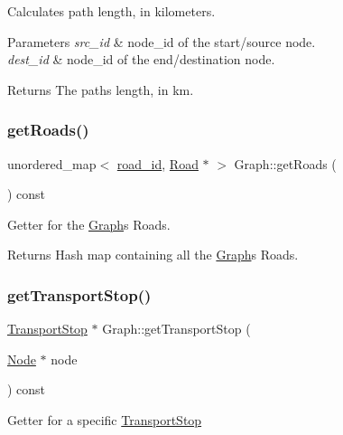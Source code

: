 Calculates path length, in kilometers.


\begin{DoxyParams}{Parameters}
{\em src\+\_\+id} & node\+\_\+id of the start/source node. \\
\hline
{\em dest\+\_\+id} & node\+\_\+id of the end/destination node.\\
\hline
\end{DoxyParams}
\begin{DoxyReturn}{Returns}
The path\textquotesingle{}s length, in km. 
\end{DoxyReturn}
\hypertarget{class_graph_a101befc9baedb7dc3aaa714c968dc943}{}\label{class_graph_a101befc9baedb7dc3aaa714c968dc943} 
\subsubsection{\texorpdfstring{get\+Roads()}{getRoads()}}
{\footnotesize\ttfamily unordered\+\_\+map$<$ \hyperlink{_road_8hpp_a8e0db0d135782948da5d293720dbfb46}{road\+\_\+id}, \hyperlink{class_road}{Road} $\ast$ $>$ Graph\+::get\+Roads (\begin{DoxyParamCaption}{ }\end{DoxyParamCaption}) const}

Getter for the \hyperlink{class_graph}{Graph}\textquotesingle{}s Roads.

\begin{DoxyReturn}{Returns}
Hash map containing all the \hyperlink{class_graph}{Graph}\textquotesingle{}s Roads. 
\end{DoxyReturn}
\hypertarget{class_graph_a8d4d4d9dc6b4f1eaf7a0c5b9bfb5979d}{}\label{class_graph_a8d4d4d9dc6b4f1eaf7a0c5b9bfb5979d} 
\subsubsection{\texorpdfstring{get\+Transport\+Stop()}{getTransportStop()}}
{\footnotesize\ttfamily \hyperlink{class_transport_stop}{Transport\+Stop} $\ast$ Graph\+::get\+Transport\+Stop (\begin{DoxyParamCaption}\item[{\hyperlink{class_node}{Node} $\ast$}]{node }\end{DoxyParamCaption}) const}

Getter for a specific \hyperlink{class_transport_stop}{Transport\+Stop}


